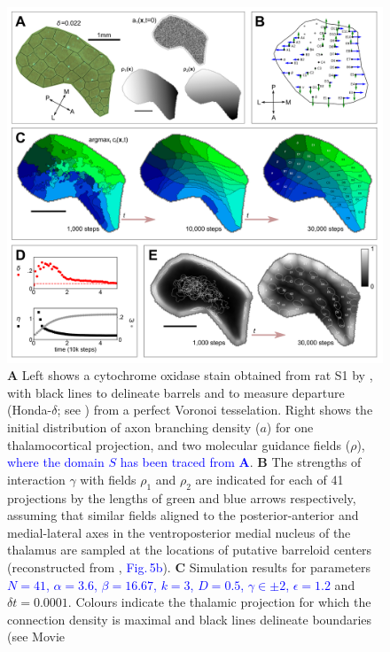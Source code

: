 \documentclass[9pt,lineno]{elife}
\newcommand{\cmnt}[1]{\textcolor{blue}{#1}}
\begin{document}
\begin{figure}
  \begin{fullwidth}
    \includegraphics[width=\linewidth]{./Fig1.png}
    \caption{\textbf{A} Left shows a cytochrome oxidase stain obtained from rat S1
      by \cite{zheng_signal_2001}, with black lines to delineate barrels and to
      measure departure (Honda-$\delta$; see \citealp{senft_mouse_1991}) from a
      perfect Voronoi tesselation. Right shows the initial distribution of axon
      branching density ($a$) for one thalamocortical projection, and two
      molecular guidance fields ($\rho$), \cmnt{where the domain $S$ has been
        traced from \textbf{A}}. \textbf{B} The strengths of interaction
      $\gamma$ with fields $\rho_1$ and $\rho_2$ are indicated for each of 41
      projections by the lengths of green and blue arrows respectively, assuming
      that similar fields aligned to the posterior-anterior and medial-lateral
      axes in the ventroposterior medial nucleus of the thalamus are sampled at
      the locations of putative barreloid centers (reconstructed from
      \citealp{haidarliu_size_2001}, \cmnt{Fig.\,5b}). \textbf{C} Simulation results for parameters
      \cmnt{$N=41$, $\alpha=3.6$, $\beta=16.67$, $k=3$, $D=0.5$, $\gamma\in\pm 2$,
      $\epsilon=1.2$} and $\delta{t}=0.0001$. Colours indicate the thalamic
      projection for which the connection density is maximal and black lines
      delineate boundaries (see Movie
}
\end{fullwidth}
\end{figure}
\end{document}

